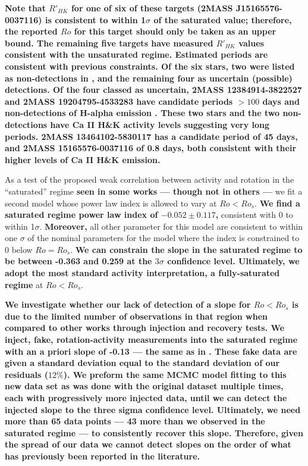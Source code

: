 \textbf{Note that $R'_{HK}$ for one of six of these targets (2MASS
J15165576-0037116) is consistent to within 1$\sigma$ of the saturated value;
therefore, the reported $Ro$ for this target should only be taken as an upper
bound. The remaining five targets have measured $R'_{HK}$ values consistent
with the unsaturated regime. Estimated periods are consistent with previous
constraints. Of the six stars, two were listed as non-detections in
\citet{Newton2018}, and the remaining four as uncertain (possible) detections.
Of the four classed as uncertain, 2MASS 12384914-3822527 and 2MASS
19204795-4533283 have candidate periods $>100$ days and non-detections of
H-alpha emission \citep{Hawley96}. These two stars and the two non-detections
have Ca II H\&K activity levels suggesting very long periods. 2MASS
13464102-5830117 has a candidate period of 45 days, and 2MASS 15165576-0037116
of 0.8 days, both consistent with their higher levels of Ca II H\&K emission.}

As a test of the proposed weak correlation between activity and rotation in the
``saturated'' regime \textbf{seen in some works \citep{Mamajek2008,
Reiners2014, Leh20, Med20} --- though not in others \citep{Wri11, Nunez2015,
Newton2017} --- }  we fit a second model whose power law index is allowed to
vary at $Ro < Ro_{s}$. \textbf{We find a saturated regime power law index of
$-0.052\pm0.117$,} consistent with 0 to within 1$\sigma$. \textbf{Moreover,}
all other parameter for this model are consistent to within one $\sigma$ of the
nominal  parameters for the model where the index is constrained to 0 below
$Ro=Ro_{s}$. \textbf{We can constrain the slope in the saturated
regime to be between -0.363 and 0.259 at the $3\sigma$ confidence level.
Ultimately, we adopt the most standard activity interpretation, a
fully-saturated regime} at $Ro < Ro_{s}$. 

\textbf{We investigate whether our lack of detection of a slope for $Ro <
Ro_{s}$ is due to the limited number of observations in that region when
compared to other works \citep[e.g.][93 targets $Ro < Ro_{s}$]{Med20} through
injection and recovery tests. We inject, fake, rotation-activity measurements
into the saturated regime with an a priori slope of -0.13 --- the same as in
\citeauthor{Med20}. These fake data are given a standard deviation equal to the
standard deviation of our residuals ($12\%$). We preform the same MCMC model
fitting to this new data set as was done with the original dataset multiple
times, each with progressively more injected data, until we can detect the
injected slope to the three sigma confidence level. Ultimately, we need more
than 65 data points --- 43 more than we observed in the saturated regime --- to
consistently recover this slope. Therefore, given the spread of our data we
cannot detect slopes on the order of what has previously been reported in the
literature.}

